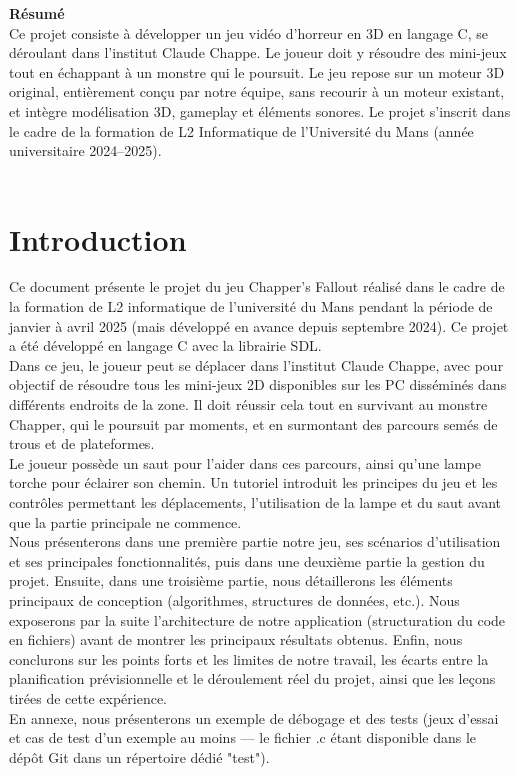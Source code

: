 \newpage
    \textbf{Résumé}\\
    Ce projet consiste à développer un jeu vidéo d’horreur en 3D en langage C,
    se déroulant dans l’institut Claude Chappe. Le joueur doit y résoudre des
    mini-jeux tout en échappant à un monstre qui le poursuit. Le jeu repose sur
    un moteur 3D original, entièrement conçu par notre équipe, sans recourir à un
    moteur existant, et intègre modélisation 3D, gameplay et éléments sonores.
    Le projet s’inscrit dans le cadre de la formation de L2 Informatique de
    l’Université du Mans (année universitaire 2024–2025).\\\\
\section{Introduction}
Ce document présente le projet du jeu Chapper's Fallout réalisé dans le cadre de
la formation de L2 informatique de l’université du Mans pendant la période de
janvier à avril 2025 (mais développé en avance depuis septembre 2024). Ce projet
a été développé en langage C avec la librairie SDL.\\

Dans ce jeu, le joueur peut se déplacer dans l’institut Claude Chappe, avec pour
objectif de résoudre tous les mini-jeux 2D disponibles sur les PC disséminés dans
différents endroits de la zone. Il doit réussir cela tout en survivant au monstre
Chapper, qui le poursuit par moments, et en surmontant des parcours semés de trous
et de plateformes.\\

Le joueur possède un saut pour l’aider dans ces parcours, ainsi qu’une lampe torche
pour éclairer son chemin. Un tutoriel introduit les principes du jeu et les contrôles
permettant les déplacements, l’utilisation de la lampe et du saut avant que la
partie principale ne commence.\\

Nous présenterons dans une première partie notre jeu, ses scénarios d’utilisation
et ses principales fonctionnalités, puis dans une deuxième partie la gestion du
projet. Ensuite, dans une troisième partie, nous détaillerons les éléments principaux
de conception (algorithmes, structures de données, etc.). Nous exposerons par la
suite l’architecture de notre application (structuration du code en fichiers) avant
de montrer les principaux résultats obtenus. Enfin, nous conclurons sur les points
forts et les limites de notre travail, les écarts entre la planification
prévisionnelle et le déroulement réel du projet, ainsi que les leçons tirées de
cette expérience.\\

En annexe, nous présenterons un exemple de débogage et des tests (jeux d’essai
et cas de test d’un exemple au moins — le fichier .c étant disponible dans le
dépôt Git dans un répertoire dédié "test").
\newpage

